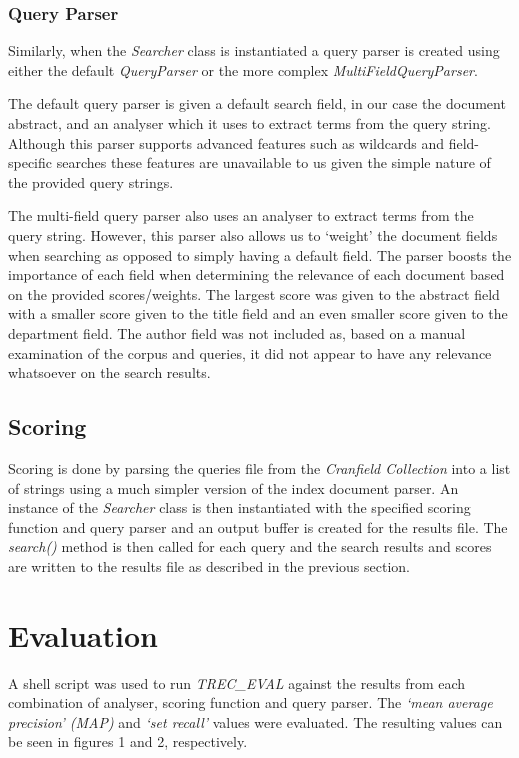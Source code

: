 \documentclass[journal]{IEEEtran}
\begin{document}
\subsubsection{Query Parser}

Similarly, when the \textit{Searcher} class is instantiated a query parser is created using either the default \textit{QueryParser} or the more complex \textit{MultiFieldQueryParser}.

The default query parser is given a default search field, in our case the document abstract, and an analyser which it uses to extract terms from the query string. Although this parser supports advanced features such as wildcards and field-specific searches these features are unavailable to us given the simple nature of the provided query strings.

The multi-field query parser also uses an analyser to extract terms from the query string. However, this parser also allows us to `weight' the document fields when searching as opposed to simply having a default field. The parser boosts the importance of each field when determining the relevance of each document based on the provided scores/weights. The largest score was given to the abstract field with a smaller score given to the title field and an even smaller score given to the department field. The author field was not included as, based on a manual examination of the corpus and queries, it did not appear to have any relevance whatsoever on the search results.

\subsection{Scoring}

Scoring is done by parsing the queries file from the \textit{Cranfield Collection} into a list of strings using a much simpler version of the index document parser. An instance of the \textit{Searcher} class is then instantiated with the specified scoring function and query parser and an output buffer is created for the results file. The \textit{search()} method is then called for each query and the search results and scores are written to the results file as described in the previous section.

\section{Evaluation}

A shell script was used to run \textit{TREC\_EVAL} against the results from each combination of analyser, scoring function and query parser. The \textit{`mean average precision' (MAP)} and \textit{`set recall'} values were evaluated. The resulting values can be seen in figures 1 and 2, respectively.
\end{document}
